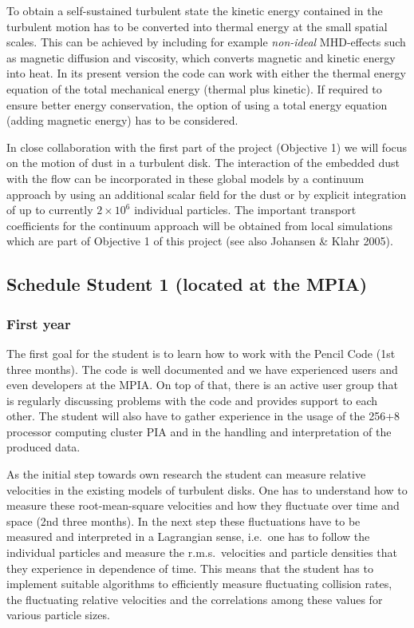 To obtain a self-sustained turbulent state the kinetic energy contained in
the turbulent motion has to be converted into thermal energy at the small
spatial scales. This can be achieved by including for example {\it
non-ideal} MHD-effects such as magnetic diffusion and viscosity, which
converts magnetic and kinetic energy into heat. In its present version the
code can work with either the thermal energy equation of the total
mechanical energy (thermal plus kinetic). If required to ensure better
energy conservation, the option of using a total energy equation (adding
magnetic energy) has to be considered.

In close collaboration with the first part of the project (Objective 1) we
will focus on the motion of dust in a turbulent disk.  The interaction of
the embedded dust with the flow can be incorporated in these global models
by a continuum approach by using an additional scalar field for the dust or
by explicit integration of up to currently $2 \times 10^6$ individual
particles. The important transport coefficients for the continuum approach
will be obtained from local simulations which are part of Objective 1 of
this project (see also Johansen \& Klahr 2005).

\subsection{Schedule Student 1 (located at the MPIA)}
\subsubsection{First year} 
The first goal for the student is to learn how to work with the Pencil Code
(1st three months).  The code is well documented and we have experienced
users and even developers at the MPIA. On top of that, there is an active
user group that is regularly discussing problems with the code and provides
support to each other.  The student will also have to gather experience in
the usage of the 256+8 processor computing cluster PIA and in the handling
and interpretation of the produced data.

As the initial step towards own research the student can measure relative
velocities in the existing models of turbulent disks. One has to understand
how to measure these root-mean-square velocities and how they fluctuate over
time and space (2nd three months).  In the next step these fluctuations have
to be measured and interpreted in a Lagrangian sense, i.e.\ one has to
follow the individual particles and measure the r.m.s.\ velocities and
particle densities that they experience in dependence of time.  This means
that the student has to implement suitable algorithms to efficiently measure
fluctuating collision rates, the fluctuating relative velocities and the
correlations among these values for various particle sizes.

